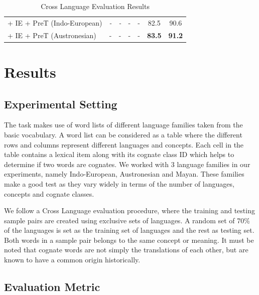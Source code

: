 \documentclass[11pt,letterpaper]{article}
\begin{document}
\begin{table}[t]
\begin{tabular}{lcccccc}
\quad + IE + PreT (Indo-European)                      & \textit{-}                           & \textit{-}                       & -                     & -                 & 82.5              & 90.6           \\
\quad + IE + PreT (Austronesian)                       & -                                    & -                                & -                     & -                 & \textbf{83.5}     & \textbf{91.2} 
\end{tabular}
\label{CL_res}
\caption{Cross Language Evaluation Results }
\end{table}

\section{Results}

\subsection{Experimental Setting}

The task makes use of word lists of different language families taken from the basic vocabulary. A word list can be considered as a table where the different rows and columns represent different languages and concepts. Each cell in the table contains a lexical item along with its cognate class ID which helps to determine if two words are cognates. We worked with 3 language families in our experiments, namely Indo-European, Austronesian and Mayan. These families make a good test as they vary widely in terms of the number of languages, concepts and cognate classes.

We follow a Cross Language evaluation procedure, where the training and testing sample pairs are created using exclusive sets of languages. A random set of 70\% of the languages is set as the training set of languages and the rest as testing set. Both words in a sample pair belongs to the same concept or meaning. It must be noted that cognate words are not simply the translations of each other, but are known to have a common origin historically.

\subsection{Evaluation Metric}
\end{document}
